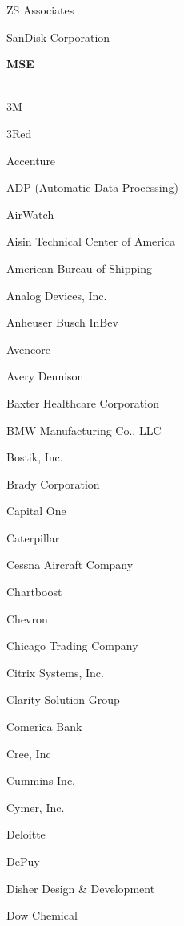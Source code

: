 \documentclass[twoside]{article}
\begin{document}
\begin{center}
\begin{multicols}{5}
\begin{FlushLeft}
\begin{compactitem}
\item ZS Associates
\item SanDisk Corporation
\end{compactitem}
        \end{FlushLeft}
        \vspace{1em}
        {\fontsize{14}{16}\selectfont \bf MSE}\\
        \vspace{-1em}
        ~\hrulefill~
        \vspace{-.9em}
        \begin{FlushLeft}
        \begin{compactitem}
        \item 3M
\item 3Red
\item Accenture
\item ADP (Automatic Data Processing)
\item AirWatch
\item Aisin Technical Center of America
\item American Bureau of Shipping
\item Analog Devices, Inc.
\item Anheuser Busch InBev
\item Avencore
\item Avery Dennison
\item Baxter Healthcare Corporation
\item BMW Manufacturing Co., LLC
\item Bostik, Inc.
\item Brady Corporation
\item Capital One
\item Caterpillar
\item Cessna Aircraft Company
\item Chartboost
\item Chevron
\item Chicago Trading Company
\item Citrix Systems, Inc.
\item Clarity Solution Group
\item Comerica Bank
\item Cree, Inc
\item Cummins Inc.
\item Cymer, Inc.
\item Deloitte
\item DePuy
\item Disher Design \& Development
\item Dow Chemical

\end{compactitem}
\end{FlushLeft}
\end{multicols}
\end{center}
\end{document}
